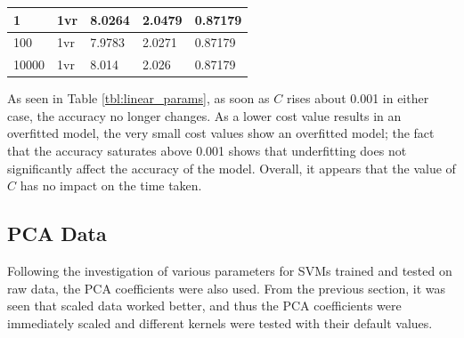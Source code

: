 \documentclass[a4paper, 10pt, conference]{ieeeconf}
\begin{document}
\begin{table}[!ht]
\begin{tabular}{lllll}
1 & 1vr & 8.0264 & 2.0479 & 0.87179\\ \hline
100 & 1vr & 7.9783 & 2.0271 & 0.87179\\ \hline
10000 & 1vr  & 8.014 & 2.026 & 0.87179\\ \hline
\end{tabular}
\end{table}

As seen in Table \ref{tbl:linear_params}, as soon as $C$ rises about 0.001 in either case, the accuracy no longer changes. As a lower cost value results in an overfitted model, the very small cost values show an overfitted model; the fact that the accuracy saturates above 0.001 shows that underfitting does not significantly affect the accuracy of the model. Overall, it appears that the value of $C$ has no impact on the time taken.

\subsection{PCA Data}
Following the investigation of various parameters for SVMs trained and tested on raw data, the PCA coefficients were also used. From the previous section, it was seen that scaled data worked better, and thus the PCA coefficients were immediately scaled and different kernels were tested with their default values.
\end{document}
